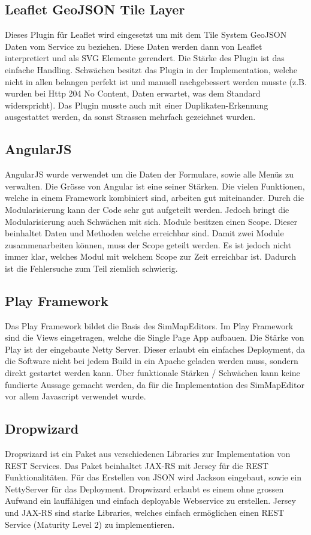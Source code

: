\subsection*{Leaflet GeoJSON Tile Layer}
Dieses Plugin für Leaflet wird eingesetzt um mit dem Tile System GeoJSON Daten vom Service zu beziehen. Diese Daten werden dann von Leaflet interpretiert und als SVG Elemente gerendert. Die Stärke des Plugin ist das einfache Handling. Schwächen besitzt das Plugin in der Implementation, welche nicht in allen belangen perfekt ist und manuell nachgebessert werden musste (z.B. wurden bei Http 204 No Content, Daten erwartet, was dem Standard widerspricht). Das Plugin musste auch mit einer Duplikaten-Erkennung ausgestattet werden, da sonst Strassen mehrfach gezeichnet wurden.
\subsection*{AngularJS}
AngularJS wurde verwendet um die Daten der Formulare, sowie alle Menüs zu verwalten. Die Grösse von Angular ist eine seiner Stärken. Die vielen Funktionen, welche in einem Framework kombiniert sind, arbeiten gut miteinander. Durch die Modularisierung kann der Code sehr gut aufgeteilt werden. Jedoch bringt die Modularisierung auch Schwächen mit sich. Module besitzen einen Scope. Dieser beinhaltet Daten und Methoden welche erreichbar sind. Damit zwei Module zusammenarbeiten können, muss der Scope geteilt werden. Es ist jedoch nicht immer klar, welches Modul mit welchem Scope zur Zeit erreichbar ist. Dadurch ist die Fehlersuche zum Teil ziemlich schwierig.
\subsection*{Play Framework}
Das Play Framework bildet die Basis des SimMapEditors. Im Play Framework sind die Views eingetragen, welche die Single Page App aufbauen. Die Stärke von Play ist der eingebaute Netty Server. Dieser erlaubt ein einfaches Deployment, da die Software nicht bei jedem Build in ein Apache geladen werden muss, sondern direkt gestartet werden kann. Über funktionale Stärken / Schwächen kann keine fundierte Aussage gemacht werden, da für die Implementation des SimMapEditor vor allem Javascript verwendet wurde.
\subsection*{Dropwizard}
Dropwizard ist ein Paket aus verschiedenen Libraries zur Implementation von REST Services. Das Paket beinhaltet JAX-RS mit Jersey für die REST Funktionalitäten. Für das Erstellen von JSON wird Jackson eingebaut, sowie ein NettyServer für das Deployment. Dropwizard erlaubt es einem ohne grossen Aufwand ein lauffähigen und einfach deployable Webservice zu erstellen. Jersey und JAX-RS sind starke Libraries, welches einfach ermöglichen einen REST Service (Maturity Level 2) zu implementieren.
